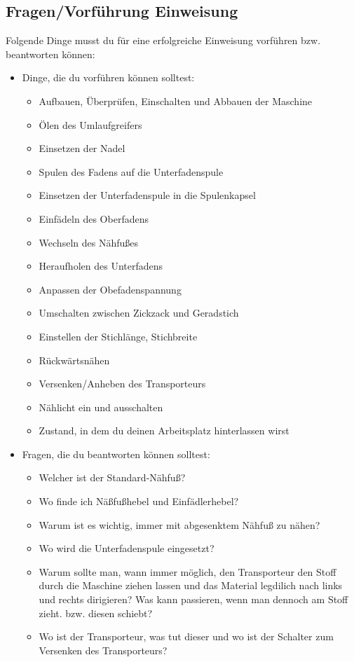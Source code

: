 \documentclass{\basedir/fablab-document}
\begin{document}
\pagebreak

\subsection{Fragen/Vorführung Einweisung}
Folgende Dinge musst du für eine erfolgreiche Einweisung vorführen bzw. beantworten können:
\begin{itemize}
	\item Dinge, die du vorführen können solltest:
	\begin{itemize}
		\item Aufbauen, Überprüfen, Einschalten und Abbauen der Maschine
		\item Ölen des Umlaufgreifers
		\item Einsetzen der Nadel
		\item Spulen des Fadens auf die Unterfadenspule
		\item Einsetzen der Unterfadenspule in die Spulenkapsel
		\item Einfädeln des Oberfadens
		\item Wechseln des Nähfußes
		\item Heraufholen des Unterfadens
		\item Anpassen der Obefadenspannung
		\item Umschalten zwischen Zickzack und Geradstich
		\item Einstellen der Stichlänge, Stichbreite
		\item Rückwärtsnähen
		\item Versenken/Anheben des Transporteurs
		\item Nählicht ein und ausschalten
		\item Zustand, in dem du deinen Arbeitsplatz hinterlassen wirst
	\end{itemize}
	
	\item Fragen, die du beantworten können solltest:
	\begin{itemize}
		\item Welcher ist der Standard-Nähfuß?
		\item Wo finde ich Näßfußhebel und Einfädlerhebel?
		\item Warum ist es wichtig, immer mit abgesenktem Nähfuß zu nähen?
		\item Wo wird die Unterfadenspule eingesetzt?
		\item Warum sollte man, wann immer möglich, den Transporteur den Stoff durch die Maschine ziehen lassen und das Material legdilich nach links und rechts dirigieren? Was kann passieren, wenn man dennoch am Stoff zieht. bzw. diesen schiebt?
		\item Wo ist der Transporteur, was tut dieser und wo ist der Schalter zum Versenken des Transporteurs?
	\end{itemize}
\end{itemize}
\end{document}
